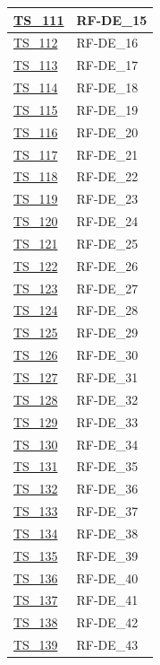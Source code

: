 \begin{longtable}{|
		>{\raggedright\arraybackslash}p{} |
		>{\centering\arraybackslash}p{} |
	}
	\hyperlink{ts-111}{TS\_111} & RF-DE\_15 \\ \hline
	\hyperlink{ts-112}{TS\_112} & RF-DE\_16 \\ \hline
	\hyperlink{ts-113}{TS\_113} & RF-DE\_17 \\ \hline
	\hyperlink{ts-114}{TS\_114} & RF-DE\_18 \\ \hline
	\hyperlink{ts-115}{TS\_115} & RF-DE\_19 \\ \hline
	\hyperlink{ts-116}{TS\_116} & RF-DE\_20 \\ \hline
	\hyperlink{ts-117}{TS\_117} & RF-DE\_21 \\ \hline
	\hyperlink{ts-118}{TS\_118} & RF-DE\_22 \\ \hline
	\hyperlink{ts-119}{TS\_119} & RF-DE\_23 \\ \hline
	\hyperlink{ts-120}{TS\_120} & RF-DE\_24 \\ \hline
	\hyperlink{ts-121}{TS\_121} & RF-DE\_25 \\ \hline
	\hyperlink{ts-122}{TS\_122} & RF-DE\_26 \\ \hline
	\hyperlink{ts-123}{TS\_123} & RF-DE\_27 \\ \hline
	\hyperlink{ts-124}{TS\_124} & RF-DE\_28 \\ \hline
	\hyperlink{ts-125}{TS\_125} & RF-DE\_29 \\ \hline
	\hyperlink{ts-126}{TS\_126} & RF-DE\_30 \\ \hline
	\hyperlink{ts-127}{TS\_127} & RF-DE\_31 \\ \hline
	\hyperlink{ts-128}{TS\_128} & RF-DE\_32 \\ \hline
	\hyperlink{ts-129}{TS\_129} & RF-DE\_33 \\ \hline
	\hyperlink{ts-130}{TS\_130} & RF-DE\_34 \\ \hline
	\hyperlink{ts-131}{TS\_131} & RF-DE\_35 \\ \hline
	\hyperlink{ts-132}{TS\_132} & RF-DE\_36 \\ \hline
	\hyperlink{ts-133}{TS\_133} & RF-DE\_37 \\ \hline
	\hyperlink{ts-134}{TS\_134} & RF-DE\_38 \\ \hline
	\hyperlink{ts-135}{TS\_135} & RF-DE\_39 \\ \hline
	\hyperlink{ts-136}{TS\_136} & RF-DE\_40 \\ \hline
	\hyperlink{ts-137}{TS\_137} & RF-DE\_41 \\ \hline
	\hyperlink{ts-138}{TS\_138} & RF-DE\_42 \\ \hline
	\hyperlink{ts-139}{TS\_139} & RF-DE\_43 \\ \hline

\end{longtable}
